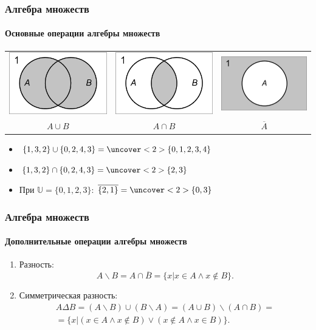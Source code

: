 \begin{frame}
    \frametitle{Алгебра множеств}
    \framesubtitle{Основные операции алгебры множеств}
    
    \begin{center}
        \begin{tabular}{ccc}
            \includegraphics[width=.3\textwidth]{fig/ABSetOr}
                & \includegraphics[width=.3\textwidth]{fig/ABSetAnd}
                    & \includegraphics[width=.3\textwidth]{fig/ASetNot}
                        \\
            $A\cup B$ 
                & $A\cap B$
                    & $\overline{A}$
        \end{tabular}
    \end{center}
    
    \begin{itemize}
        \item $\{1,3,2\}\cup\{0,2,4,3\}=\uncover<2>{\{0,1,2,3,4\}}$
        \item $\{1,3,2\}\cap\{0,2,4,3\}=\uncover<2>{\{2,3\}}$
        \item При $\mathbb{U}=\{0,1,2,3\}$: $\overline{\{2,1\}}=\uncover<2>{\{0,3\}}$
    \end{itemize}
\end{frame}

\begin{frame}
    \frametitle{Алгебра множеств}
    \framesubtitle{Дополнительные операции алгебры множеств}
    
    \begin{enumerate}
        \item Разность:
        \[
            A\backslash B=A\cap\overline{B}=\{x|x\in A \land x\not\in B\}.
        \]
        
        \item Симметрическая разность:
        \[
            \begin{split}
                A\Delta B=(A\backslash B)\cup(B\backslash A)=(A\cup B)\backslash(A\cap B)=\\
                =\{x|(x\in A \land x\not\in B)\lor(x\not\in A\land x\in B)\}.
            \end{split}
        \]
    \end{enumerate}
\end{frame}


